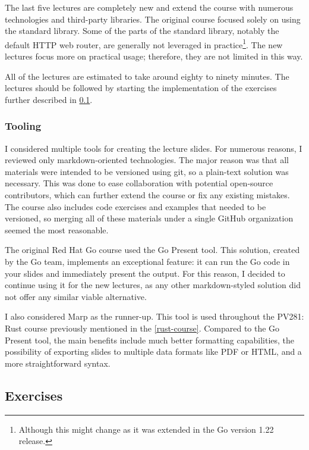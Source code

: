 \documentclass[
  digital,
  color,
  oneside,
  nosansbold,
  nocolorbold,
  nolof,
  nolot,
]{fithesis4}
\begin{document}
The last five lectures are completely new and extend the course with numerous technologies and third-party libraries. The original course focused solely on using the standard library. Some of the parts of the standard library, notably the default HTTP web router, are generally not leveraged in practice\footnote{Although this might change as it was extended in the Go version 1.22 release.}. The new lectures focus more on practical usage; therefore, they are not limited in this way.

All of the lectures are estimated to take around eighty to ninety minutes. The lectures should be followed by starting the implementation of the exercises further described in \cref{exercises}.

\subsubsection{Tooling}

I considered multiple tools for creating the lecture slides. For numerous reasons, I reviewed only markdown-oriented technologies. The major reason was that all materials were intended to be versioned using git, so a plain-text solution was necessary. This was done to ease collaboration with potential open-source contributors, which can further extend the course or fix any existing mistakes. The course also includes code exercises and examples that needed to be versioned, so merging all of these materials under a single GitHub organization seemed the most reasonable.

The original Red Hat Go course used the Go Present tool\cite{go-present}. This solution, created by the Go team, implements an exceptional feature: it can run the Go code in your slides and immediately present the output. For this reason, I decided to continue using it for the new lectures, as any other markdown-styled solution did not offer any similar viable alternative.

I also considered Marp\cite{marp} as the runner-up. This tool is used throughout the PV281: Rust course previously mentioned in the \cref{rust-course}. Compared to the Go Present tool, the main benefits include much better formatting capabilities, the possibility of exporting slides to multiple data formats like PDF or HTML, and a more straightforward syntax.

\subsection{Exercises}\label{exercises}
\end{document}

